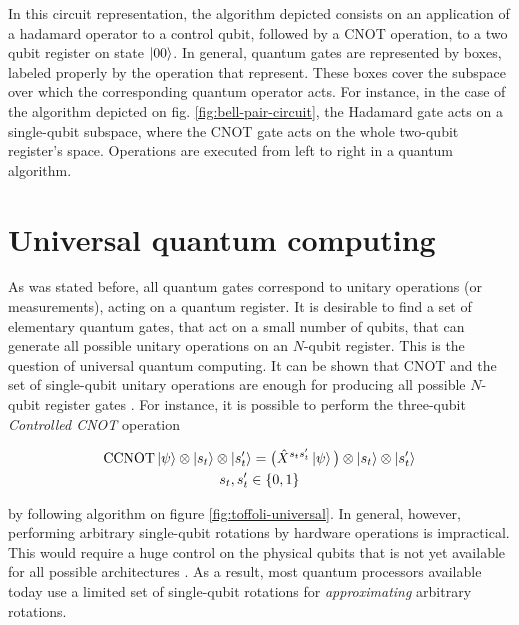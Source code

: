     

    In this circuit representation, the algorithm depicted consists on an application of a hadamard operator to a control qubit, followed by a CNOT operation, to a two qubit register on state $\ket{00}$. In general, quantum gates are represented by boxes, labeled properly by the operation that represent. These boxes cover the subspace over which the corresponding quantum operator acts. For instance, in the case of the algorithm depicted on fig. \ref{fig:bell-pair-circuit}, the Hadamard gate acts on a single-qubit subspace, where the CNOT gate acts on the whole two-qubit register's space. Operations are executed from left to right in a quantum algorithm.

\section{Universal quantum computing}
  
  As was stated before, all quantum gates correspond to unitary operations (or measurements), acting on a quantum register. It is desirable to find a set of elementary quantum gates, that act on a small number of qubits, that can generate all possible unitary operations on an $N$-qubit register. This is the question of universal quantum computing. It can be shown that CNOT and the set of single-qubit unitary operations are enough for producing all possible $N$-qubit register gates \cite{Nielsen}. For instance, it is possible to perform the three-qubit \textit{Controlled CNOT} operation

  \begin{gather}
    \text{CCNOT} \ket{\psi} \otimes \ket{s_t} \otimes \ket{s'_t} = \big(\hat{X}^{s_t s'_t} \ket{\psi}\big) \otimes \ket{s_t} \otimes \ket{s'_t} \\
    s_t, s'_t \in \{0,1\}
    \label{eq:toffoli-definition}
  \end{gather}

  by following algorithm on figure \ref{fig:toffoli-universal}. In general, however, performing arbitrary single-qubit rotations by hardware operations is impractical. This would require a huge control on the physical qubits that is not yet available for all possible architectures \cite{Nielsen}. As a result, most quantum processors available today use a limited set of single-qubit rotations for \textit{approximating} arbitrary rotations.

  

